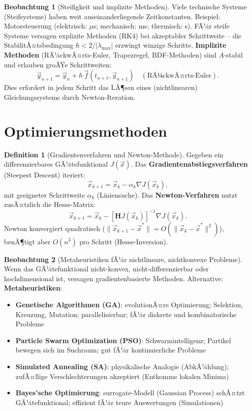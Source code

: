 ﻿\documentclass[a4paper,12pt]{report}
\theoremstyle{definition}
\newtheorem{definition}{Definition}
\newtheorem{beobachtung}{Beobachtung}
\begin{document}
\begin{beobachtung}[Steifigkeit und implizite Methoden]
Viele technische Systeme (Steifsysteme) haben weit auseinanderliegende
Zeitkonstanten. Beispiel: Motorsteuerung (elektrisch: $\mu$s; mechanisch: ms; thermisch: s).
FÃ¼r steife Systeme versagen explizite Methoden (RK4) bei akzeptabler Schrittweite --
die StabilitÃ¤tsbedingung $h < 2/|\lambda_{\max}|$ erzwingt winzige Schritte.
\textbf{Implizite Methoden} (RÃ¼ckwÃ¤rts-Euler, Trapezregel, BDF-Methoden)
sind $A$-stabil und erlauben groÃŸe Schrittweiten:
\[
  \vec{y}_{n+1} = \vec{y}_n + h\,\vec{f}(t_{n+1}, \vec{y}_{n+1}) \quad (\text{RÃ¼ckwÃ¤rts-Euler}).
\]
Dies erfordert in jedem Schritt das LÃ¶sen eines (nichtlinearen) Gleichungssystems
durch Newton-Iteration.
\end{beobachtung}

\section{Optimierungsmethoden}

\begin{definition}[Gradientenverfahren und Newton-Methode]
Gegeben ein differenzierbares GÃ¼tefunktional $J(\vec{x})$.
Das \textbf{Gradientenabstiegsverfahren} (Steepest Descent) iteriert:
\[
  \vec{x}_{k+1} = \vec{x}_k - \alpha_k \nabla J(\vec{x}_k),
\]
mit geeigneter Schrittweite $\alpha_k$ (Liniensuche).
Das \textbf{Newton-Verfahren} nutzt zusÃ¤tzlich die Hesse-Matrix:
\[
  \vec{x}_{k+1} = \vec{x}_k - [\mathbf{H}J(\vec{x}_k)]^{-1}\nabla J(\vec{x}_k).
\]
Newton konvergiert quadratisch ($\|\vec{x}_{k+1}-\vec{x}^*\| = O(\|\vec{x}_k-\vec{x}^*\|^2)$),
benÃ¶tigt aber $O(n^3)$ pro Schritt (Hesse-Inversion).
\end{definition}

\begin{beobachtung}[Metaheuristiken fÃ¼r nichtlineare, nichtkonvexe Probleme]
Wenn das GÃ¼tefunktional nicht-konvex, nicht-differenzierbar oder
hochdimensional ist, versagen gradientenbasierte Methoden.
Alternative: \textbf{Metaheuristiken}:
\begin{itemize}
    \item[-] \textbf{Genetische Algorithmen (GA)}: evolutionÃ¤re Optimierung;
          Selektion, Kreuzung, Mutation; parallelisierbar; fÃ¼r diskrete und kombinatorische Probleme
    \item[-] \textbf{Particle Swarm Optimization (PSO)}: Schwarmintelligenz;
          Partikel bewegen sich im Suchraum; gut fÃ¼r kontinuierliche Probleme
    \item[-] \textbf{Simulated Annealing (SA)}: physikalische Analogie (AbkÃ¼hlung);
          zufÃ¤llige Verschlechterungen akzeptiert (Entkomme lokalen Minima)
    \item[-] \textbf{Bayes'sche Optimierung}: surrogate-Modell (Gaussian Process)
          schÃ¤tzt GÃ¼tefunktional; effizient fÃ¼r teure Auswertungen (Simulationen)
\end{itemize}
\end{beobachtung}
\end{document}
